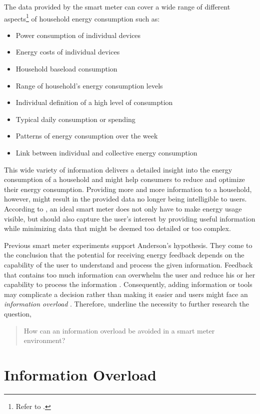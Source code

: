 The data provided by the smart meter can cover a wide range of different aspects\footnote{Refer to \citep{WillAnderson2009}.} of household energy consumption such as:
    \begin{itemize}
    \item Power consumption of individual devices
    \item Energy costs of individual devices
    \item Household baseload consumption
    \item Range of household's energy consumption levels
    \item Individual definition of a high level of consumption
    \item Typical daily consumption or spending
    \item Patterns of energy consumption over the week
    \item Link between individual and collective energy consumption
    \end{itemize}%
This wide variety of information delivers a detailed insight into the energy consumption of a household and might help consumers to reduce and optimize their energy consumption. Providing more and more information to a household, however, might result in the provided data no longer being intelligible to users. According to \cite{WillAnderson2009}, an ideal smart meter does not only have to make energy usage visible, but should also capture the user's interest by providing useful information while minimizing data that might be deemed too detailed or too complex.

Previous smart meter experiments support Anderson's hypothesis. They come to the conclusion that the potential for receiving energy feedback depends on the capability of the user to understand and process the given information.
Feedback that contains too much information can overwhelm the user and reduce his or her capability to process the information \citep{Henryson2000}. Consequently,  adding information or tools may complicate a decision rather than making it easier \citep{Darby2006} and users might face an \textit{information overload} \citep{Fischer2008}. Therefore, \cite{WillAnderson2009} underline the necessity to further research the question, 
\begin{quote}
How can an information overload be avoided in a smart meter environment?
\end{quote}

\section{Information Overload}
\label{ch:Literature Review:sec:Information Overload}

